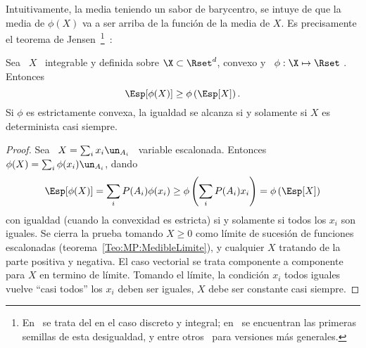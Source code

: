 %
Intuitivamente, la  media teniendo un sabor  de barycentro, se intuye  de que la
media  de $\phi(X)$ va  a ser  arriba de  la funci\'on  de la  media de  $X$. Es
precisamente el  teorema de Jensen~\footnote{En~\cite{Jen06} se trata  del en el
  caso discreto  y integral; en~\cite{Hol89,  Had93} se encuentran  las primeras
  semillas de  esta desigualdad,  y entre otros~\cite{Jes31:I,  Jes31:II, Per74,
    Rud91}  para versiones  m\'as generales.\label{Foot:SZ:Jensen}}~\cite{Jen06,
 Fel71, Bre88, AshDol99, AthLah06, Coh13}:
%
\begin{teorema}
\label{Teo:MP:Jensen}
%
  Sea \ $X$ \ integrable y definida  sobre $\X \subset \Rset^d$, convexo y \ $\phi:
  \X \mapsto \Rset$ . Entonces
  \[
  \Esp[\phi(X)] \ge \phi\left( \Esp[X] \right).
  \]
  Si $\phi$ es  estrictamente convexa, la igualdad se alcanza  si y solamente si
  $X$ es determinista casi siempre.
\end{teorema}
%
\begin{proof}
  Sea \ $X = \sum_i x_i  \un_{A_i}$ \ variable escalonada. Entonces \ $\phi(X) =
  \sum_i \phi(x_i) \un_{A_i}$, dando
  \[
  \Esp[\phi(X)]  = \sum_i  P(A_i)  \phi(x_i) \ge  \phi\left(  \sum_i P(A_i)  x_i
  \right) = \phi\left( \Esp[X] \right)
  \]
  con igualdad  (cuando la convexidad es  estricta) si y solamente  si todos los
  $x_i$ son  iguales.  Se cierra  la prueba tomando  $X \ge 0$ como  l\'imite de
  sucesi\'on de funciones escalonadas (teorema~\ref{Teo:MP:MedibleLimite}),
  y cualquier $X$ tratando de la parte positiva y negativa.
  El caso  vectorial se  trata componente  a componente para  $X$ en  termino de
  l\'imite.  Tomando el  l\'imite,  la condici\'on  $x_i$  todos iguales  vuelve
  ``casi todos''  los $x_i$ deben ser  iguales, \ie $X$ debe  ser constante casi
  siempre.
\end{proof}

